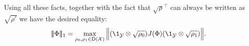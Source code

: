 \documentclass[boxes,pages,color=SeaGreen]{homework}
\newcommand{\X}{\mathcal{X}}
\newcommand{\Y}{\mathcal{Y}}
\newcommand{\Density}{\mathrm{D}}
\newcommand{\triplenorm}[1]{
  \lvert\!\lvert\!\lvert #1 
  \rvert\!\rvert\!\rvert}
\begin{document}
\begin{solution}
    Using all these facts, together with the fact that $\sqrt{\rho}^\intercal$ can always be written as $\sqrt{\rho'}$ we have the desired equality:
    \begin{equation*}
        \triplenorm{\Phi}_1 = \max_{\rho_0,\rho_1\in\Density(\X)} \norm\Big{\qty(\1_\Y\otimes\sqrt{\rho_0})J(\Phi)\qty(\1_\Y\otimes\sqrt{\rho_1})}.
    \end{equation*}
\end{solution}
\end{document}
